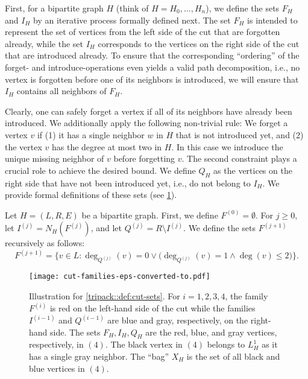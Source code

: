 \documentclass[a4paper,UKenglish,cleveref, autoref, thm-restate]{lipics-v2021}
\begin{document}
First, for a bipartite graph $H$ (think of $H = H_0, \dots, H_n$), we define the sets $F_H$ and $I_H$ by an iterative process formally defined next.
The set $F_H$ is intended to represent the set of vertices from the left side of the cut that are forgotten already, while the set $I_H$ corresponds to the vertices on the right side of the cut that are introduced already. 
To ensure that the corresponding ``ordering'' of the forget- and introduce-operations even yields a valid path decomposition, i.e., no vertex is forgotten before one of its neighbors is introduced, we will ensure that $I_H$ contains all neighbors of $F_H$.

Clearly, one can safely forget a vertex if all of its neighbors have already been introduced. 
We additionally apply the following non-trivial rule:
We forget a vertex $v$ if (1) it has a single neighbor $w$ in $H$ that is not introduced yet, and (2) the vertex $v$ has the degree at most two in $H$.
In this case we introduce the unique missing neighbor of $v$ before forgetting $v$.
The second constraint plays a crucial role to achieve the desired bound.
We define $Q_H$ as the vertices on the right side that have not been introduced yet, i.e., do not belong to $I_H$.
We provide formal definitions of these sets (see \cref{fig:cut-sets}).

\begin{definition}\label{tripack::def:cut-sets}
    Let $H=(L, R, E)$ be a bipartite graph. 
    First, we define $F^{(0)} = \emptyset$. For $j\geq 0$, let $I^{(j)} = N_H(F^{(j)})$, and  let $Q^{(j)} = R\setminus I^{(j)}$. 
    We define the sets $F^{(j+1)}$ recursively as follows:
    \[
        F^{(j+1)} = \big\{v\in L\colon \deg_{Q^{(j)}}(v) = 0 \lor \big(\deg_{Q^{(j)}}(v) = 1 \land \deg(v) \leq 2\big)\big\}.
    \]
\end{definition}

\begin{figure}[t]
	\centering
	\texttt{[image: cut-families-eps-converted-to.pdf]}
	\caption{\label{fig:cut-sets}
	Illustration for \cref{tripack::def:cut-sets}.
	For $i=1,2,3,4$, the family $F^{(i)}$ is red on the left-hand side of the cut while the families $I^{(i-1)}$ and $Q^{(i-1)}$ are blue and gray, respectively, on the right-hand side. 
	The sets $F_H, I_H, Q_H$ are the red, blue, and gray vertices, respectively, in $(4)$. 
	The black vertex in $(4)$ belongs to $L^1_H$ as it has a single gray neighbor. The ``bag'' $X_H$ is the set of all black and blue vertices in $(4)$.\\	
	}	
\end{figure}
\end{document}
